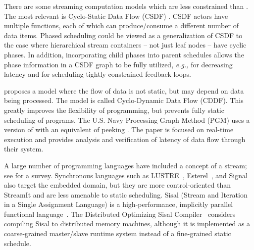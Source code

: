 There are some streaming computation models which are less constrained
than {\SDF}. The most relevant is Cyclo-Static Data Flow (CSDF)
\cite{BELP96,parks95comparison}.  CSDF actors have multiple {\work}
functions, each of which can produce/consume a different number of
data items.  Phased scheduling could be viewed as a generalization of
CSDF to the case where hierarchical stream containers -- not just leaf
nodes -- have cyclic phases.  In addition, incorporating child phases
into parent schedules allows the phase information in a CSDF graph to
be fully utilized, {\it e.g.,} for decreasing latency and for
scheduling tightly constrained feedback loops.

\cite{wauters96cyclodynamic} proposes a model where the flow of data
is not static, but may depend on data being processed. The model is
called Cyclo-Dynamic Data Flow (CDDF). This greatly improves the
flexibility of programming, but prevents fully static scheduling of
programs. The U.S. Navy Processing Graph Method (PGM) uses a version
of {\SDF} with an equivalent of peeking \cite{goddard00navy}.  The
paper is focused on real-time execution and provides analysis and
verification of latency of data flow through their system.

A large number of programming languages have included a concept of a
stream; see \cite{survey97} for a survey.  Synchronous languages such
as LUSTRE~\cite{lustre}, Esterel~\cite{esterel92}, and
Signal~\cite{signal} also target the embedded domain, but they are
more control-oriented than StreamIt and are less amenable to static
scheduling.  Sisal (Stream and Iteration in a Single Assignment
Language) is a high-performance, implicitly parallel functional
language~\cite{sisal}.  The Distributed Optimizing Sisal
Compiler~\cite{sisal} considers compiling Sisal to distributed memory
machines, although it is implemented as a coarse-grained master/slave
runtime system instead of a fine-grained static schedule.

